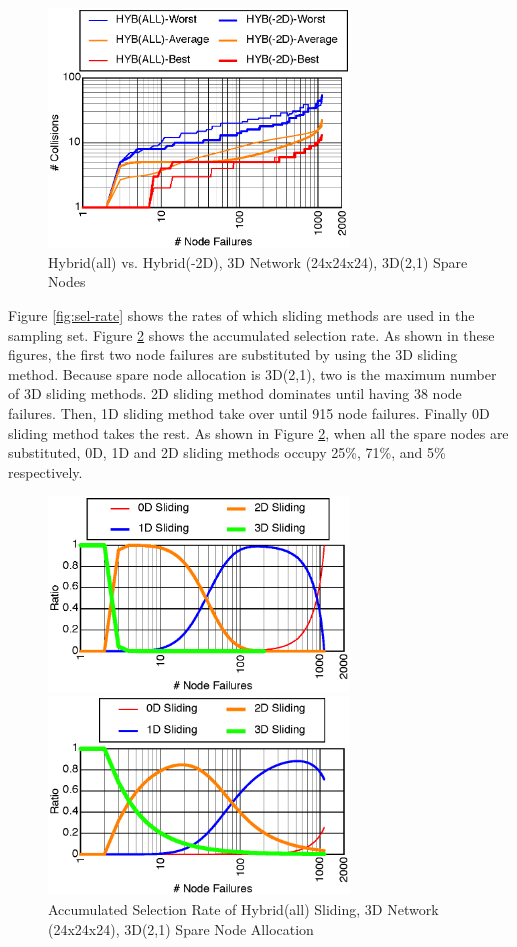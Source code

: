 \documentclass[Afour,times,sageh]{sagej}
\begin{document}
\begin{figure}[ht]
\centering
\includegraphics[width=80mm]{Figs/24x24x24-HYB310-CL.eps}
  \caption{Hybrid(all) vs. Hybrid(-2D), 3D Network
    (24x24x24), 3D(2,1) Spare Nodes}
  \label{fig:24x24x24-hyb-2d}
\end{figure}

Figure \ref{fig:sel-rate} shows the rates of which sliding methods are
used in the sampling set. Figure \ref{fig:sel-rateA} shows the
accumulated selection rate. As shown in these figures, the first two
node failures are substituted by using the 3D sliding method. Because
spare node allocation is 3D(2,1), two is the maximum number of 3D
sliding methods. 2D sliding method dominates until having 38 node
failures. Then, 1D sliding method take over until 915 node
failures. Finally 0D sliding method takes the rest. As shown in Figure
\ref{fig:sel-rateA}, when all the spare nodes are substituted, 0D, 1D
and 2D sliding methods occupy 25\%, 71\%, and 5\% respectively.

\begin{figure}[ht]
\centering
\includegraphics[width=80mm]{Figs/HYB-24x24x24-Sel-CL.eps}
  \caption{Selection Rate of Hybrid(all) Sliding, 3D Network
    (24x24x24), 3D(2,1) Spare Node Allocation}
\label{fig:sel-rate}
\vspace{5mm}
\includegraphics[width=80mm]{Figs/HYB-24x24x24-SelA-CL.eps}
  \caption{Accumulated Selection Rate of Hybrid(all) Sliding,
    3D Network (24x24x24), 3D(2,1) Spare Node Allocation}
\label{fig:sel-rateA}
\end{figure}
\end{document}
